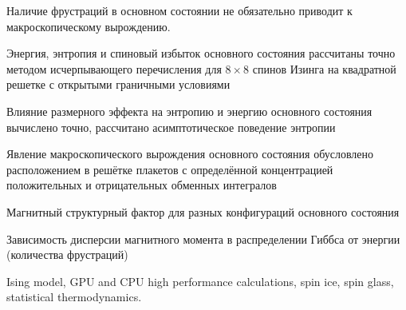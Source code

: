\documentclass[utf8, babel, sor, jor, amsmath, amssymb, reprint]{elsarticle} %
\begin{document}
\begin{frontmatter}
\begin{highlights}
	\item Наличие фрустраций в основном состоянии не обязательно приводит к макроскопическому вырождению.
	\item Энергия, энтропия и спиновый избыток основного состояния рассчитаны точно методом исчерпывающего перечисления для $8 \times 8$ спинов Изинга на квадратной решетке с открытыми граничными условиями
	\item Влияние размерного эффекта на энтропию и энергию основного состояния вычислено точно, рассчитано асимптотическое поведение энтропии
	\item Явление макроскопического вырождения основного состояния обусловлено расположением в решётке плакетов с определённой концентрацией положительных и отрицательных обменных интегралов
	\item Магнитный структурный фактор для разных конфигураций основного состояния
	\item Зависимость дисперсии магнитного момента в распределении Гиббса от энергии (количества фрустраций)
\end{highlights}


\begin{keyword}
	Ising model, GPU and CPU high performance calculations, spin ice, spin glass, statistical thermodynamics.
\end{keyword}


\end{frontmatter}
\end{document}

